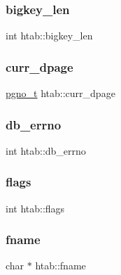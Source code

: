 \mbox{\label{structhtab_a13d0d4e3ecdde7a7b11a846396255cd0}} 
\subsubsection{\texorpdfstring{bigkey\_len}{bigkey\_len}}
{\footnotesize\ttfamily int htab\+::bigkey\+\_\+len}

\mbox{\label{structhtab_ab19afd3577916a17ccb184cbefe45629}} 
\subsubsection{\texorpdfstring{curr\_dpage}{curr\_dpage}}
{\footnotesize\ttfamily \mbox{\hyperlink{adat-devel_2other__libs_2filedb_2filehash_2ffdb__db_8h_a000813331643d38481142bcce7de1501}{pgno\+\_\+t}} htab\+::curr\+\_\+dpage}

\mbox{\label{structhtab_a27cb940c79df2d115593e71ab05a0643}} 
\subsubsection{\texorpdfstring{db\_errno}{db\_errno}}
{\footnotesize\ttfamily int htab\+::db\+\_\+errno}

\mbox{\label{structhtab_aec553f223cf81af78090be98b9e4a132}} 
\subsubsection{\texorpdfstring{flags}{flags}}
{\footnotesize\ttfamily int htab\+::flags}

\mbox{\label{structhtab_a2e699b43ff625c1419e150beec230ab3}} 
\subsubsection{\texorpdfstring{fname}{fname}}
{\footnotesize\ttfamily char $\ast$ htab\+::fname}

